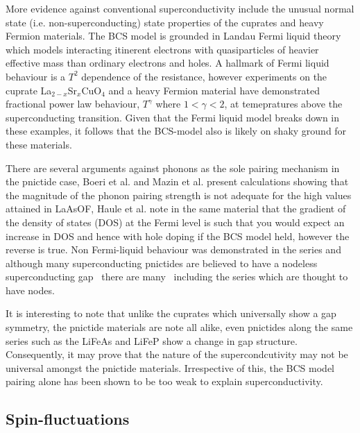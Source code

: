 More evidence against conventional superconductivity include the unusual normal state (i.e. non-superconducting) state properties of the cuprates and heavy Fermion materials. The BCS model is grounded in Landau Fermi liquid theory which models interacting itinerent electrons with quasiparticles of heavier effective mass than ordinary electrons and holes. A hallmark of Fermi liquid behaviour is a $T^2$ dependence of the resistance, however experiments on the cuprate La$_{2-x}$Sr$_{x}$CuO$_4$\cite{Cooper2009} and a heavy Fermion material\cite{Custers2003} have demonstrated fractional power law behaviour, $T^\gamma$ where $1 < \gamma < 2$, at temepratures above the superconducting transition. Given that the Fermi liquid model breaks down in these examples, it follows that the BCS-model also is likely on shaky ground for these materials.

There are several arguments against phonons as the sole pairing mechanism in the pnictide case, Boeri et al.\cite{Boeri2008} and Mazin et al.\cite{Mazin2008} present calculations showing that the magnitude of the phonon pairing strength is not adequate for the high \Tc values attained in LaAsOF, Haule et al.\cite{Haule2008} note in the same material that the gradient of the density of states (DOS) at the Fermi level is such that you would expect an increase in DOS and hence \Tc with hole doping if the BCS model held, however the reverse is true. Non Fermi-liquid behaviour was demonstrated in the \BaFePAs series\cite{Jiang2009,Kasahara2010} and although many superconducting pnictides are believed to have a nodeless superconducting gap~\cite{Hashimoto2012,Zhang2011a,Ding2008, Terashima2009} there are many~\cite{Fletcher2009, Qiu2011b, Song2011, Dong2010, Hashimoto2012} including the \BaFePAs series\cite{Zhang2011,Yamashita2011a,Suzuki2011} which are thought to have nodes.

It is interesting to note that unlike the cuprates which universally show a \DxTwoyTwo gap symmetry, the pnictide materials are note all alike, even pnictides along the same series such as the LiFeAs and LiFeP show a change in gap structure. Consequently, it may prove that the nature of the supercondcutivity may not be universal amongst the pnictide materials. Irrespective of this, the BCS model pairing alone has been shown to be too weak to explain \highTc superconductivity.


\subsection{Spin-fluctuations}

